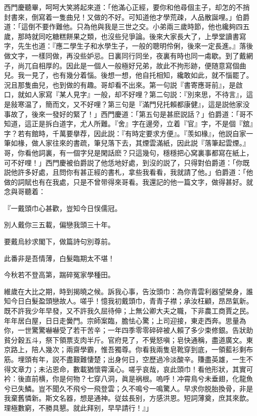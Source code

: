西門慶聽畢，呵呵大笑將起來道：「他滿心正經，要你和他尋個主子，却怎的不捎封書來，倒寫着一隻曲兒！又做的不好。可知道他才學荒疎，人品散誕哩。」伯爵道：「這倒不要作難他。只為他與我是三世之交。小弟兩三歲時節，他也纔夠四五歲，那時就同吃糖糕餅果之類，也沒些兒爭論。後來大家長大了，上學堂讀書寫字，先生也道：『應二學生子和水學生子，一般的聰明伶俐，後來一定長進。』落後做文字，一樣同做，再没些妒忌。日裏同行同坐，夜裏有時也同一䖏歇。到了戴網子，尚兀自相厚的。因此是一個人一般極好兄弟，故此不拘形跡，便随意寫個曲兒。我一見了，也有幾分着惱。後想一想，他自托相知，纔敢如此，就不惱罷了。況且那隻曲兒，也到做的有趣。哥却看不出來。第一句説『書寄應哥前』，是啟口，就如人家寫『某人見字』一般，却不好哩？第二句説：『別來思，不待言』，這是敍寒温了，簡而文，又不好哩？第三句是『滿門兒托賴都康健』，這是説他家没事故了，後來一發好的緊了！」西門慶道：「第五句是甚麽説話？」伯爵道：「哥不知道，這正是拆白道字，尤人所難。『舍』字在邊旁，立着『官』字，不是個『舘』字？若有館時，千萬要擧荐，因此説：『有時定要求方便』。『羡如椽』，他説自家一筆如椽，做人家往來的書疏，筆兒落下去，其煙雲滿紙，因此説『落筆起雲煙。』哥，你看他詞裏，有一個字兒是閑話麽？只這幾句，穩穩把心窝裏事都寫在紙上，可不好哩！」西門慶被伯爵説了他恁地好處，到沒的説了，只得對伯爵道：「你既説他許多好處，且問你有甚正經的書札，拿些我看看，我就請了他。」伯爵道：「他做的詞賦也有在我處，只是不曾带得來哥看。我還記的他一篇文字，做得甚好。就念與哥聽着：

\begin{myquote}
『一戴頭巾心甚歡，豈知今日悮儒冠。

別人戴你三五載，偏戀我頭三十年。

要戴烏紗求閣下，做篇詩句別尊前。

此番非是吾情薄，白髮臨期太不堪！

今秋若不登高第，踹碎冤家學種田。
\end{myquote}

\begin{myquote}
維歲在大比之期，時到揭曉之候。訴我心事，告汝頭巾：為你青雲利器望榮身，誰知今日白髮盈頭戀故人。嗟乎！憶我初戴頭巾，青青子襟；承汝枉顧，昂昂氣新。既不許我少年早發，又不許我久屈待伸；上無公卿大夫之職，下非農工商賈之民。年年居白屋，日日走黌門。宗師案臨，膽怯心驚；上司迎接，東走西奔。思量為你，一世驚驚嚇嚇受了若干苦辛；一年四季零零碎碎被人賴了多少束修銀。告狀助貧分穀五斗，祭下領票支肉半斤。官府見了，不覺怒嗔；皂快通稱，盡道廣文。東京路上，陪人幾次；兩齋學霸，惟吾獨尊。你看我兩隻皂靴穿到底，一領藍衫剩布筋。埋頭有年，説不盡艱難悽楚；出身何日，空歷過冷淡酸辛。賺盡英雄，一生不得文章力；未沾恩命，數載猶懷霄漢心。嗟乎哀哉，哀此頭巾！看他形狀，其實可衿：後直前横，你是何物？七穿八洞，眞是祸根。嗚呼！冲霄鳥兮未垂翅，化龍魚兮已失鱗。豈不聞久不飛兮一飛登雲；久不鳴兮一鳴驚人。早求你脱胎換骨，非是我棄舊憐新。斯文名器，想是通神。従兹長别，方感洪恩。短詞薄奠，庶其來歆。理極數窮，不勝具懇。就此拜别，早早請行！』」
\end{myquote}

